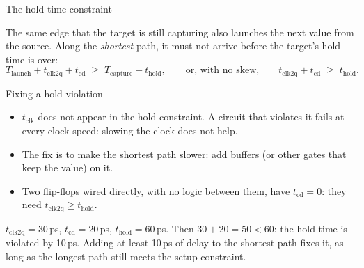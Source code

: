 \documentclass[10pt]{wosm-slides}
\newcommand*\spanbox[4]{%
  \node[span, minimum width={(#2-#1)*1.1cm}, anchor=west] at (#1,#3) {#4};}
\begin{document}
\begin{frame}{The hold time constraint}
  \begin{center}
  \end{center}

  The same edge that the target is still capturing also launches the next value from
  the source. Along the \emph{shortest} path, it must not arrive before the target's
  hold time is over:
  \[
    T_{\mathrm{launch}} + t_{\mathrm{clk2q}} + t_{\mathrm{cd}}
    \;\ge\; T_{\mathrm{capture}} + t_{\mathrm{hold}},
    \qquad\text{or, with no skew,}\qquad
    t_{\mathrm{clk2q}} + t_{\mathrm{cd}} \;\ge\; t_{\mathrm{hold}}.
  \]
\end{frame}

\begin{frame}{Fixing a hold violation}
  \begin{itemize}
    \item $t_{\mathrm{clk}}$ does not appear in the hold constraint. A circuit that
      violates it fails at \alert{every} clock speed: slowing the clock does not
      help.
    \item The fix is to make the shortest path slower: add buffers (or other gates
      that keep the value) on it.
    \item Two flip-flops wired directly, with no logic between them, have
      $t_{\mathrm{cd}} = 0$: they need $t_{\mathrm{clk2q}} \ge t_{\mathrm{hold}}$.
  \end{itemize}

  \begin{example}
    $t_{\mathrm{clk2q}} = 30$\,ps, $t_{\mathrm{cd}} = 20$\,ps,
    $t_{\mathrm{hold}} = 60$\,ps. Then $30 + 20 = 50 < 60$: the hold time is
    violated by 10\,ps. Adding at least 10\,ps of delay to the shortest path fixes
    it, as long as the longest path still meets the setup constraint.
  \end{example}
\end{frame}
\end{document}
